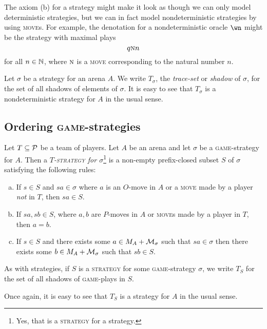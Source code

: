 \documentclass{article}
\newcommand{\game}{\textsc{game}}
\newcommand{\move}{\textsc{move}}
\newcommand{\strategy}{\textsc{strategy}}
\begin{document}
\begin{remark}
  The axiom (b) for a strategy might make it look as though we can only model deterministic strategies, but we can in fact model nondeterministic strategies by using \move{}s.  
  For example, the denotation for a nondeterministic oracle $\wn$ might be the strategy with maximal plays
  \[
    q\textsc{n}n
    \]
  for all $n\in\bN$, where $\textsc{n}$ is a \move{} corresponding to the natural number $n$.
\end{remark}

\begin{definition}
  Let $\sigma$ be a strategy for an arena $A$.  
  We write $T_\sigma$, the \emph{trace-set} or \emph{shadow} of $\sigma$, for the set of all shadows of elements of $\sigma$.  
  It is easy to see that $T_\sigma$ is a nondeterministic strategy for $A$ in the usual sense.  
\end{definition}

\subsection{Ordering \game{}-strategies}

\begin{definition}
  Let $T\subset \P$ be a team of players.  
  Let $A$ be an arena and let $\sigma$ be a \game{}-strategy for $A$.  
  Then a \emph{$T$-\strategy{} for $\sigma$}\footnote{Yes, that is a \strategy{} for a strategy.} is a non-empty prefix-closed subset $S$ of $\sigma$ satisfying the following rules:
  \begin{enumerate}[a)]
    \item If $s\in S$ and $sa\in\sigma$ where $a$ is an $O$-move in $A$ or a \move{} made by a player \emph{not} in $T$, then $sa\in S$.  
    \item If $sa,sb\in S$, where $a,b$ are $P$-moves in $A$ or \move{}s made by a player in $T$, then $a=b$.  
    \item If $s\in S$ and there exists some $a\in M_A+\M_\sigma$ such that $sa\in \sigma$ then there exists some $b\in M_A+\M_\sigma$ such that $sb\in S$.
  \end{enumerate}
\end{definition}

\begin{definition}
  As with strategies, if $S$ is a \strategy{} for some \game{}-strategy $\sigma$, we write $T_S$ for the set of all shadows of \game{}-plays in $S$.  

  Once again, it is easy to see that $T_S$ is a strategy for $A$ in the usual sense.  
\end{definition}
\end{document}
